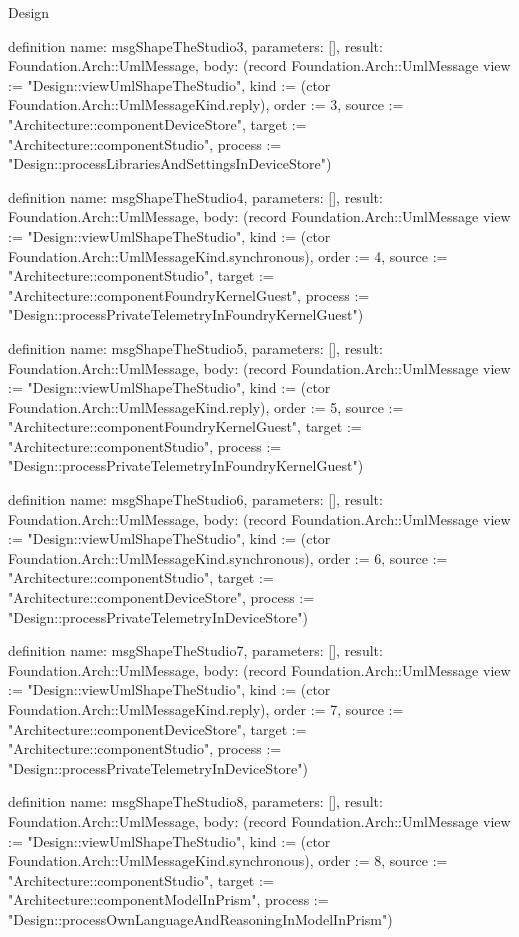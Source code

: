 \begin{lexlean}{Design}
\begin{semanticmodule}
definition{
  name: msgShapeTheStudio3,
  parameters: [],
  result: Foundation.Arch::UmlMessage,
  body: (record Foundation.Arch::UmlMessage {view := "Design::viewUmlShapeTheStudio", kind := (ctor Foundation.Arch::UmlMessageKind.reply), order := 3, source := "Architecture::componentDeviceStore", target := "Architecture::componentStudio", process := "Design::processLibrariesAndSettingsInDeviceStore"})
}

definition{
  name: msgShapeTheStudio4,
  parameters: [],
  result: Foundation.Arch::UmlMessage,
  body: (record Foundation.Arch::UmlMessage {view := "Design::viewUmlShapeTheStudio", kind := (ctor Foundation.Arch::UmlMessageKind.synchronous), order := 4, source := "Architecture::componentStudio", target := "Architecture::componentFoundryKernelGuest", process := "Design::processPrivateTelemetryInFoundryKernelGuest"})
}

definition{
  name: msgShapeTheStudio5,
  parameters: [],
  result: Foundation.Arch::UmlMessage,
  body: (record Foundation.Arch::UmlMessage {view := "Design::viewUmlShapeTheStudio", kind := (ctor Foundation.Arch::UmlMessageKind.reply), order := 5, source := "Architecture::componentFoundryKernelGuest", target := "Architecture::componentStudio", process := "Design::processPrivateTelemetryInFoundryKernelGuest"})
}

definition{
  name: msgShapeTheStudio6,
  parameters: [],
  result: Foundation.Arch::UmlMessage,
  body: (record Foundation.Arch::UmlMessage {view := "Design::viewUmlShapeTheStudio", kind := (ctor Foundation.Arch::UmlMessageKind.synchronous), order := 6, source := "Architecture::componentStudio", target := "Architecture::componentDeviceStore", process := "Design::processPrivateTelemetryInDeviceStore"})
}

definition{
  name: msgShapeTheStudio7,
  parameters: [],
  result: Foundation.Arch::UmlMessage,
  body: (record Foundation.Arch::UmlMessage {view := "Design::viewUmlShapeTheStudio", kind := (ctor Foundation.Arch::UmlMessageKind.reply), order := 7, source := "Architecture::componentDeviceStore", target := "Architecture::componentStudio", process := "Design::processPrivateTelemetryInDeviceStore"})
}

definition{
  name: msgShapeTheStudio8,
  parameters: [],
  result: Foundation.Arch::UmlMessage,
  body: (record Foundation.Arch::UmlMessage {view := "Design::viewUmlShapeTheStudio", kind := (ctor Foundation.Arch::UmlMessageKind.synchronous), order := 8, source := "Architecture::componentStudio", target := "Architecture::componentModelInPrism", process := "Design::processOwnLanguageAndReasoningInModelInPrism"})
}


\end{semanticmodule}
\end{lexlean}
